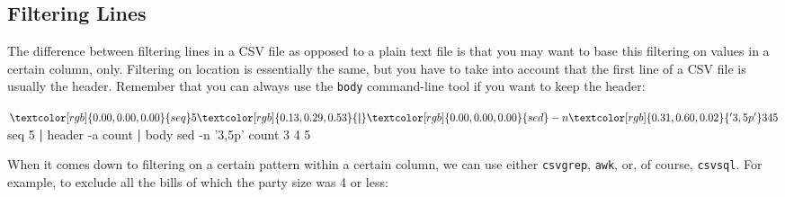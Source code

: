 \documentclass[
]{book}
\newenvironment{Shaded}{\begin{snugshade}}{\end{snugshade}}
\newcommand{\ExtensionTok}[1]{#1}
\newcommand{\FunctionTok}[1]{\textcolor[rgb]{0.00,0.00,0.00}{#1}}
\newcommand{\KeywordTok}[1]{\textcolor[rgb]{0.13,0.29,0.53}{\textbf{#1}}}
\newcommand{\NormalTok}[1]{#1}
\newcommand{\StringTok}[1]{\textcolor[rgb]{0.31,0.60,0.02}{#1}}
\theoremstyle{definition}
\theoremstyle{definition}
\theoremstyle{definition}
\theoremstyle{remark}
\begin{document}
\hypertarget{filtering-lines-1}{%
\subsection{Filtering Lines}\label{filtering-lines-1}}

The difference between filtering lines in a CSV file as opposed to a plain text file is that you may want to base this filtering on values in a certain column, only. Filtering on location is essentially the same, but you have to take into account that the first line of a CSV file is usually the header. Remember that you can always use the \texttt{body} command-line tool if you want to keep the header:

\begin{Shaded}
\begin{Highlighting}[]
\NormalTok{$ }\FunctionTok{seq}\NormalTok{ 5 }\KeywordTok{|} \FunctionTok{sed}\NormalTok{ -n }\StringTok{'3,5p'}
\ExtensionTok{3}
\ExtensionTok{4}
\ExtensionTok{5}
\NormalTok{$ }\FunctionTok{seq}\NormalTok{ 5 }\KeywordTok{|} \ExtensionTok{header}\NormalTok{ -a count }\KeywordTok{|} \ExtensionTok{body}\NormalTok{ sed -n }\StringTok{'3,5p'}
\ExtensionTok{count}
\ExtensionTok{3}
\ExtensionTok{4}
\ExtensionTok{5}
\end{Highlighting}
\end{Shaded}

When it comes down to filtering on a certain pattern within a certain column, we can use either \texttt{csvgrep}, \texttt{awk}, or, of course, \texttt{csvsql}. For example, to exclude all the bills of which the party size was 4 or less:
\end{document}
